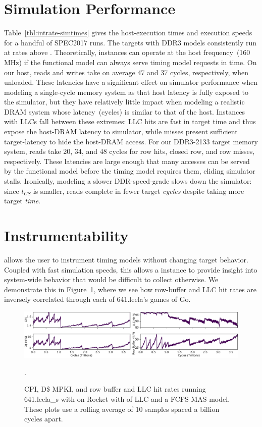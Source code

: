 \section{Simulation Performance}



Table~\ref{tbl:intrate-simtimes} gives the
host-execution times and execution speeds for a handful of SPEC2017 runs. The
targets with DDR3 models consistently run at rates above . Theoretically,
\PNAME instances can operate at the host frequency~(160 MHz) if the functional model can always serve timing model requests in time.
On our host, reads and writes take on average 47
and 37 cycles, respectively, when unloaded.  These latencies have
a significant effect on simulator performance when modeling a single-cycle memory
system as that host latency is fully exposed to the simulator, but
they have relatively little impact
when modeling a realistic DRAM system
whose latency~(cycles) is similar to that of the host.
Instances with LLCs fall between these extremes: LLC hits are fast in
target time and thus expose the host-DRAM latency to simulator, while
misses present sufficient target-latency to hide the host-DRAM access.
For our DDR3-2133 target memory system, reads take 20, 34, and 48 cycles for
row hits, closed row, and row misses, respectively. These latencies are large enough that many accesses can be
served by the functional model before the timing model requires them, eliding simulator stalls.
Ironically, modeling a slower DDR-speed-grade slows down the simulator: since $t_{CS}$ is smaller, reads complete in fewer target
\emph{cycles} despite taking more target \emph{time}.

\section{Instrumentability}
\PNAME allows the user to instrument timing models without changing target
behavior. Coupled with fast simulation speeds, this allows a \PNAME instance to
provide insight into system-wide behavior that would be difficult to collect
otherwise. We demonstrate this in Figure~\ref{fig:leela-time-series}, where we
see how row-buffer and LLC hit rates are inversely correlated through each of
641.leela's games of Go.

\begin{figure}
    \centering
    \includegraphics[width=\textwidth]{figures/leela-time-series.pdf}
    \caption{CPI, D\$ MPKI, and row buffer and LLC hit rates running
    641.leela\_s with on Rocket with  of LLC and a FCFS MAS
    model. These plots use a rolling average of 10 samples spaced a billion
    cycles apart.}.
    \label{fig:leela-time-series}
\end{figure}


